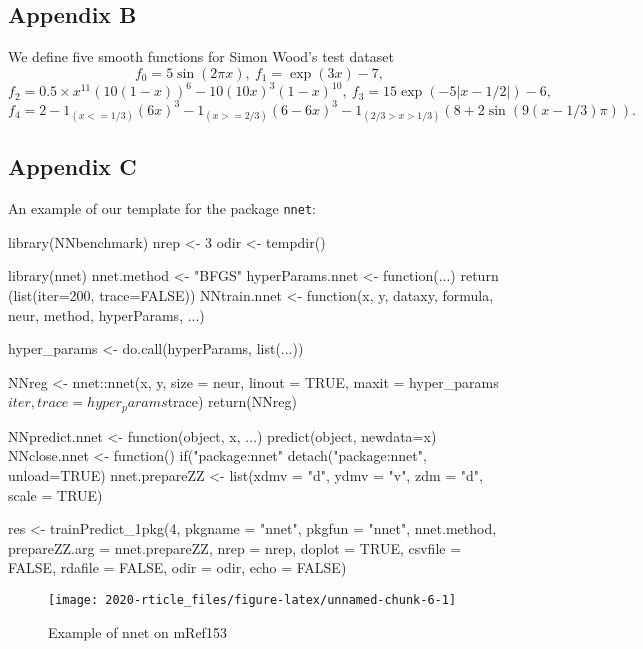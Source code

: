 \hypertarget{appendix-b}{%
\subsection{Appendix B}\label{appendix-b}}

We define five smooth functions for Simon Wood's test dataset \[
f_0=5\sin(2\pi x),~
f_1=\exp(3x)-7,
\] \[
f_2=0.5\times x^{11}(10(1 - x))^6 - 10 (10x)^3(1 - x)^{10},~
f_3=15 \exp(-5 |x-1/2|)-6,
\] \[
f_4=2-1_{(x <= 1/3)}(6x)^3 - 1_{(x >= 2/3)} (6-6x)^3 - 
1_{(2/3 > x > 1/3)}(8+2\sin(9(x-1/3)\pi)).
\]

\hypertarget{appendix-c}{%
\subsection{Appendix C}\label{appendix-c}}

An example of our template for the package \texttt{nnet}:

\begin{Schunk}
\begin{Sinput}
library(NNbenchmark)
nrep <- 3       
odir <- tempdir()

library(nnet)
nnet.method <- "BFGS"
hyperParams.nnet <- function(...) {
    return (list(iter=200, trace=FALSE))
}
NNtrain.nnet <- function(x, y, dataxy, formula, neur, method, hyperParams, ...) {
    
    hyper_params <- do.call(hyperParams, list(...))
    
    NNreg <- nnet::nnet(x, y, size = neur, linout = TRUE, 
                        maxit = hyper_params$iter, trace=hyper_params$trace)
    return(NNreg)
}
NNpredict.nnet  <- function(object, x, ...) { predict(object, newdata=x) }
NNclose.nnet    <- function() {  if("package:nnet" %in% search())
                                detach("package:nnet", unload=TRUE) }
nnet.prepareZZ  <- list(xdmv = "d", ydmv = "v", zdm = "d", scale = TRUE)
\end{Sinput}
\end{Schunk}

\begin{Schunk}
\begin{Sinput}
res <- trainPredict_1pkg(4, pkgname = "nnet", pkgfun = "nnet", nnet.method,
  prepareZZ.arg = nnet.prepareZZ, nrep = nrep, doplot = TRUE,
  csvfile = FALSE, rdafile = FALSE, odir = odir, echo = FALSE)
\end{Sinput}
\begin{figure}

{\centering \texttt{[image: 2020-rticle\_files/figure-latex/unnamed-chunk-6-1]} 

}

\caption[Example of nnet on mRef153]{Example of nnet on mRef153}\label{fig:unnamed-chunk-6}
\end{figure}
\end{Schunk}

